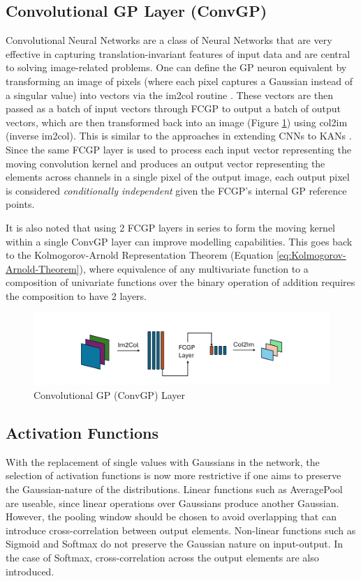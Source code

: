 \documentclass{article}
\begin{document}
\subsection{Convolutional GP Layer (ConvGP)}
Convolutional Neural Networks \cite{CNN} are a class of Neural Networks that are very effective in capturing translation-invariant features of input data and are central to solving image-related problems. One can define the GP neuron equivalent by transforming an image of pixels (where each pixel captures a Gaussian instead of a singular value) into vectors via the im2col routine \cite{im2col_first,im2col_phdthesis}. These vectors are then passed as a batch of input vectors through FCGP to output a batch of output vectors, which are then transformed back into an image (Figure \ref{fig:Convolutional_GP}) using col2im (inverse im2col). This is similar to the approaches in extending CNNs to KANs \cite{ConvolutionalKAN}. Since the same FCGP layer is used to process each input vector representing the moving convolution kernel and produces an output vector representing the elements across channels in a single pixel of the output image, each output pixel is considered \textit{conditionally independent} given the FCGP's internal GP reference points.

It is also noted that using 2 FCGP layers in series to form the moving kernel within a single ConvGP layer can improve modelling capabilities. This goes back to the Kolmogorov-Arnold Representation Theorem (Equation \ref{eq:Kolmogorov-Arnold-Theorem}), where equivalence of any multivariate function to a composition of univariate functions over the binary operation of addition requires the composition to have 2 layers.

\begin{figure}[t]
    \centering
    \includegraphics[width=0.9\columnwidth]{Convolutional_GP.pdf}
    \caption{Convolutional GP (ConvGP) Layer}
    \label{fig:Convolutional_GP}
\end{figure}

\subsection{Activation Functions}
With the replacement of single values with Gaussians in the network, the selection of activation functions is now more restrictive if one aims to preserve the Gaussian-nature of the distributions. Linear functions such as AveragePool \cite{poolingmethods} are useable, since linear operations over Gaussians produce another Gaussian. However, the pooling window should be chosen to avoid overlapping that can introduce cross-correlation between output elements. Non-linear functions such as Sigmoid and Softmax do not preserve the Gaussian nature on input-output. In the case of Softmax, cross-correlation across the output elements are also introduced.
\end{document}
